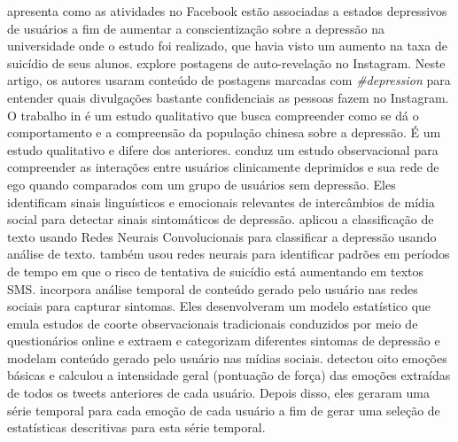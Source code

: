 \documentclass[11pt, notitlepage]{article} %
\begin{document}
\cite{Park:2015:MDL:2675133.2675139} apresenta como as atividades no Facebook estão associadas a estados depressivos de usuários a fim de aumentar a conscientização sobre a depressão na universidade onde o estudo foi realizado, que havia visto um aumento na taxa de suicídio de seus alunos. \cite{andalibi_sensitive_2017} explore postagens de auto-revelação no Instagram. Neste artigo, os autores usaram conteúdo de postagens marcadas com \emph{\#depression} para entender quais divulgações bastante confidenciais as pessoas fazem no Instagram. O trabalho in \cite{Li2016} é um estudo qualitativo que busca compreender como se dá o comportamento e a compreensão da população chinesa sobre a depressão. É um estudo qualitativo e difere dos anteriores. \cite{Vedula2017} conduz um estudo observacional para compreender as interações entre usuários clinicamente deprimidos e sua rede de ego quando comparados com um grupo de usuários sem depressão. Eles identificam sinais linguísticos e emocionais relevantes de intercâmbios de mídia social para detectar sinais sintomáticos de depressão. \cite{Zhao:2018:TCM:3302425.3302501} aplicou a classificação de texto usando Redes Neurais Convolucionais para classificar a depressão usando análise de texto. \cite{Nobles:2018:IIS:3173574.3173987} também usou redes neurais para identificar padrões em períodos de tempo em que o risco de tentativa de suicídio está aumentando em textos SMS. \cite{Yazdavar:2017:SAM:3110025.3123028} incorpora análise temporal de conteúdo gerado pelo usuário nas redes sociais para capturar sintomas. Eles desenvolveram um modelo estatístico que emula estudos de coorte observacionais tradicionais conduzidos por meio de questionários online e extraem e categorizam diferentes sintomas de depressão e modelam conteúdo gerado pelo usuário nas mídias sociais. \cite{Chen2018} detectou oito emoções básicas e calculou a intensidade geral (pontuação de força) das emoções extraídas de todos os tweets anteriores de cada usuário. Depois disso, eles geraram uma série temporal para cada emoção de cada usuário a fim de gerar uma seleção de estatísticas descritivas para esta série temporal.
\end{document}
